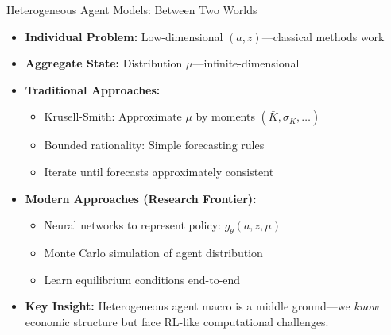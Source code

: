 \begin{frame}{Heterogeneous Agent Models: Between Two Worlds}
\begin{itemize}
\item \textbf{Individual Problem:} Low-dimensional $(a, z)$---classical methods work
\item \textbf{Aggregate State:} Distribution $\mu$---infinite-dimensional

\medskip
\item \textbf{Traditional Approaches:}
\begin{itemize}
    \item Krusell-Smith: Approximate $\mu$ by moments $(\bar{K}, \sigma_K, \ldots)$
    \item Bounded rationality: Simple forecasting rules
    \item Iterate until forecasts approximately consistent
\end{itemize}

\medskip
\item \textbf{Modern Approaches (Research Frontier):}
\begin{itemize}
    \item Neural networks to represent policy: $g_\theta(a, z, \mu)$
    \item Monte Carlo simulation of agent distribution
    \item Learn equilibrium conditions end-to-end
\end{itemize}

\medskip
\item \textbf{Key Insight:} Heterogeneous agent macro is a middle ground---we \emph{know} economic structure but face RL-like computational challenges.
\end{itemize}
\end{frame}

